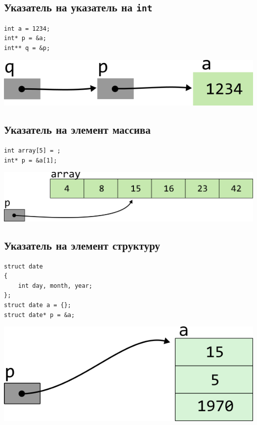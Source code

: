 \documentclass{article}
\begin{document}
\subsection*{Указатель на указатель на \texttt{int}}
\begin{lstlisting}
int a = 1234;
int* p = &a;
int** q = &p;
\end{lstlisting}
\begin{center}
\includegraphics[scale=1]{../../images/pointer_schemes/pointer_to_pointer_to_int.png}
\end{center}

\subsection*{Указатель на элемент массива}
\begin{lstlisting}
int array[5] = ;
int* p = &a[1];
\end{lstlisting}
\begin{center}
\includegraphics[scale=1]{../../images/pointer_schemes/pointer_to_array_of_ints.png}
\end{center}

\subsection*{Указатель на элемент структуру}
\begin{lstlisting}
struct date
{
	int day, month, year;
};
struct date a = {};
struct date* p = &a;
\end{lstlisting}
\begin{center}
\includegraphics[scale=1]{../../images/pointer_schemes/pointer_to_struct_date.png}
\end{center}
\end{document}
